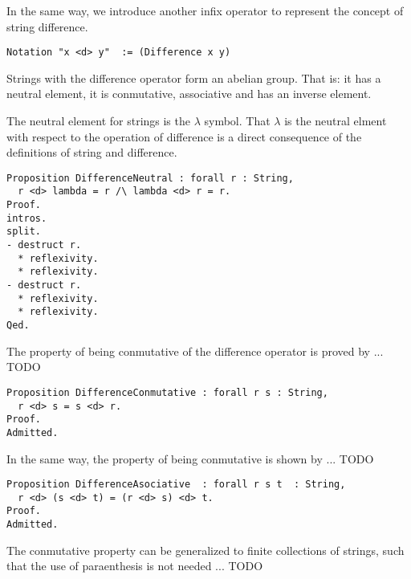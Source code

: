 In the same way, we introduce another infix operator to represent the concept of string difference.

\begin{sourcecode}
{\scriptsize \begin{verbatim}
Notation "x <d> y"  := (Difference x y)
\end{verbatim}}
\end{sourcecode}

Strings with the difference operator form an abelian group. That is: it has a neutral element, it is conmutative, associative and has an inverse element.

The neutral element for strings is the $\lambda$ symbol. That $\lambda$ is the neutral elment with respect to the operation of difference is a direct consequence of the definitions of string and difference.

\begin{sourcecode}
{\scriptsize \begin{verbatim}
Proposition DifferenceNeutral : forall r : String,
  r <d> lambda = r /\ lambda <d> r = r.
Proof.
intros.
split.
- destruct r.
  * reflexivity.
  * reflexivity.
- destruct r.
  * reflexivity.
  * reflexivity.
Qed.
\end{verbatim}}
\end{sourcecode}

The property of being conmutative of the difference operator is proved by ... {\color{red} TODO}

\begin{sourcecode}
{\scriptsize \begin{verbatim}
Proposition DifferenceConmutative : forall r s : String,
  r <d> s = s <d> r.
Proof.
Admitted.
\end{verbatim}}
\end{sourcecode}

In the same way, the property of being conmutative is shown by ... {\color{red} TODO}

\begin{sourcecode}
{\scriptsize \begin{verbatim}
Proposition DifferenceAsociative  : forall r s t  : String,
  r <d> (s <d> t) = (r <d> s) <d> t.
Proof.
Admitted.
\end{verbatim}}
\end{sourcecode}

The conmutative property can be generalized to finite collections of strings, such that the use of paraenthesis is not needed ... {\color{red} TODO}

